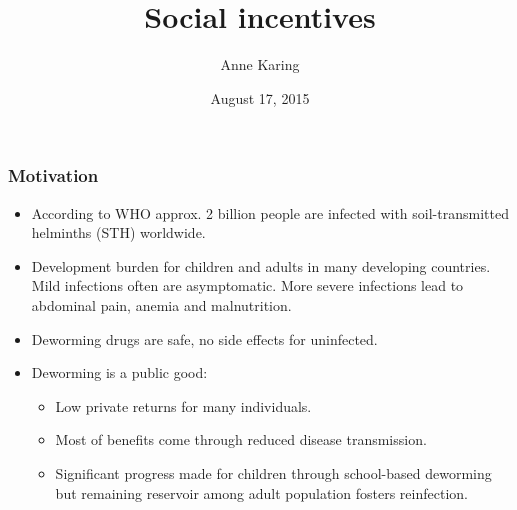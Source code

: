 \documentclass{beamer}
\title{Social incentives}
\author{Anne Karing}
\date{August 17, 2015}
\theoremstyle{plain}
\begin{document}
\def\newblock{\hskip .11em plus .33em minus .07em}


\begin{frame}[label=slide1]
\frametitle{\large{Motivation}}
\small{
\begin{itemize}
\item According to WHO approx. 2 billion people are infected with soil-transmitted helminths (STH) worldwide. %
\item Development burden for children and adults in many developing countries. Mild infections often are asymptomatic. More severe infections lead to abdominal pain, anemia and malnutrition.  %
\item Deworming drugs are safe, no side effects for uninfected. 
\item Deworming is a public good: 
\begin{itemize}
\item Low private returns for many individuals. 
\item Most of benefits come through reduced disease transmission. 
\item Significant progress made for children through school-based deworming but remaining reservoir among adult population fosters reinfection. %
\end{itemize}
\end{itemize}}
\end{frame}
\end{document}
